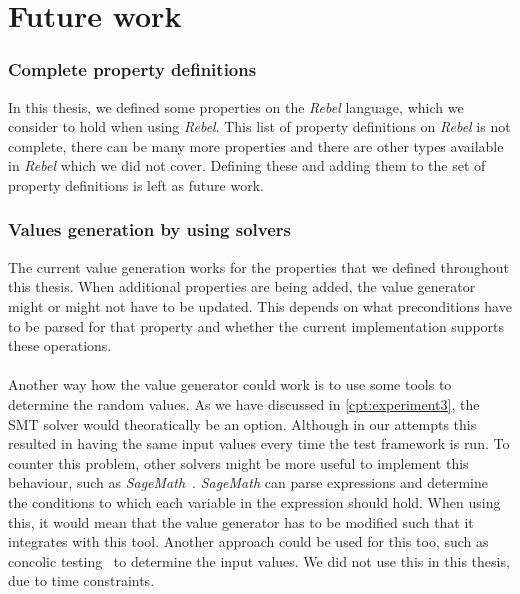 \section{Future work}

\subsubsection{Complete property definitions}
In this thesis, we defined some properties on the \textit{Rebel} language,
which we consider to hold when using \textit{Rebel}. This list of property
definitions on \textit{Rebel} is not complete, there can be many more properties
and there are other types available in \textit{Rebel} which we did not cover.
Defining these and adding them to the set of property definitions is left as
future work.

\subsubsection{Values generation by using solvers}
The current value generation works for the properties that we defined throughout this thesis. When additional properties are being added, the value generator might or might not have to be updated. This depends on what preconditions have to be parsed for that property and whether the current implementation supports these operations.\\%
\\
Another way how the value generator could work is to use some tools to determine the random values. As we have discussed in \autoref{cpt:experiment3}, the SMT solver would theoratically be an option. Although in our attempts this resulted in having the same input values every time the test framework is run. To counter this problem, other solvers might be more useful to implement this behaviour, such as \textit{SageMath}~\cite{siteSageMath2017}. \textit{SageMath} can parse expressions and determine the conditions to which each variable in the expression should hold. When using this, it would mean that the value generator has to be modified such that it integrates with this tool. Another approach could be used for this too, such as concolic testing~\cite{sen2006cute} to determine the input values. We did not use this in this thesis, due to time constraints.

